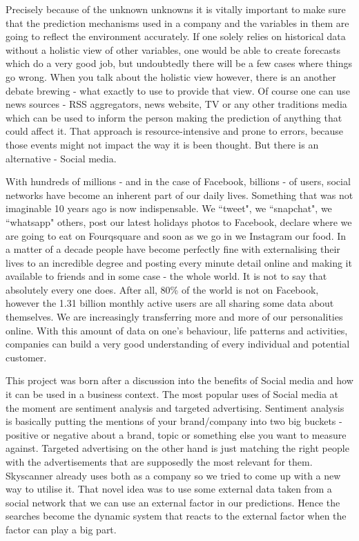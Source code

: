 \documentclass[minf,twoside,singlespacing,parskip,notimes,deptreport]{infthesis} %
\begin{document}
Precisely because of the unknown unknowns it is vitally important to make sure that the prediction mechanisms used in a company and the variables in them are going to reflect the environment accurately. 
If one solely relies on historical data without a holistic view of other variables, one would be able to create forecasts which do a very good job, but undoubtedly there will be a few cases where things go wrong. 
When you talk about the holistic view however, there is an another debate brewing - what exactly to use to provide that view. Of course one can use news sources - RSS aggregators, news website, TV or any other traditions media which can be used to inform the person making the prediction of anything that could affect it. 
That approach is resource-intensive and prone to errors, because those events might not impact the way it is been thought. But there is an alternative - Social media. 

With hundreds of millions - and in the case of Facebook, billions - of users, social networks have become an inherent part of our daily lives. Something that was not imaginable 10 years ago is now indispensable. 
We ``tweet", we ``snapchat", we ``whatsapp" others, post our latest holidays photos to Facebook, declare where we are going to eat on Fourqsquare and soon as we go in we Instagram our food. 
In a matter of a decade people have become perfectly fine with externalising their lives to an incredible degree and posting every minute detail online and making it available to friends and in some case - the whole world. 
It is not to say that absolutely every one does. 
After all, 80\% of the world is not on Facebook\cite{FBstats}, however the 1.31 billion monthly active users are all sharing some data about themselves. 
We are increasingly transferring more and more of our personalities online.
 With this amount of data on one's behaviour, life patterns and activities, companies can build a very good understanding of every individual and potential customer.


This project was born after a discussion into the benefits of Social media and how it can be used in a business context. 
The most popular uses of Social media at the moment are sentiment analysis and targeted advertising. 
Sentiment analysis is basically putting the mentions of your brand/company into two big buckets - positive or negative about a brand, topic or something else you want to measure against.
Targeted advertising on the other hand is just matching the right people with the advertisements that are supposedly the most relevant for them. 
Skyscanner already uses both as a company so we tried to come up with a new way to utilise it.
That novel idea was to use some external data taken from a social network that we can use an external factor in our predictions. 
Hence the searches become the dynamic system that reacts to the external factor when the factor can play a big part. 
\end{document}
